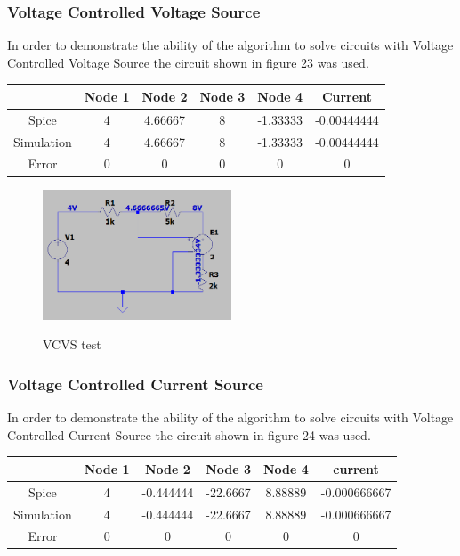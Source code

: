 \documentclass{article}
\begin{document}
\subsubsection{Voltage Controlled Voltage Source}
  In order to demonstrate the ability of the algorithm to solve circuits with Voltage Controlled Voltage Source the circuit shown in figure 23 was used.
\begin{center}
\begin{tabular}{ |c|c|c|c|c|c|}
\hline
 & Node 1 & Node 2 & Node 3 & Node 4 & Current\\ 
 \hline
 Spice & 4 & 4.66667 & 8 & -1.33333 & -0.00444444 \\  
 \hline
 Simulation & 4 & 4.66667 & 8 & -1.33333 & -0.00444444 \\ 
 \hline
 Error & 0 & 0 & 0 & 0 & 0\\
 \hline
\end{tabular}
\end{center}

\begin{figure}[h]
    \caption{VCVS test}
    \centering
    \includegraphics[width=0.5\textwidth]{images/VCVS_test.PNG}
    \label{fig:LinearTest}
\end{figure}

\subsubsection{Voltage Controlled Current Source}
In order to demonstrate the ability of the algorithm to solve circuits with Voltage Controlled Current Source the circuit shown in figure 24 was used.

\begin{center}
\begin{tabular}{ |c|c|c|c|c|c|}
\hline
 & Node 1 & Node 2 & Node 3 & Node 4 & current\\ 
 \hline
 Spice & 4 & -0.444444 & -22.6667 & 8.88889 & -0.000666667\\  
 \hline
 Simulation & 4 & -0.444444 & -22.6667 & 8.88889 & -0.000666667 \\ 
 \hline
 Error & 0 & 0 & 0 & 0 & 0\\
 \hline
\end{tabular}
\end{center}
\end{document}
